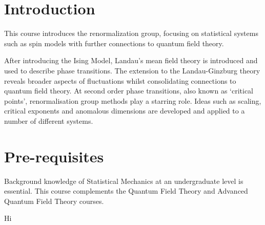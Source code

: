 \documentclass[a4paper,11pt]{article}
\begin{document}
	\maketitlepage
	\preliminaries

	\section*{Introduction}
	
	This course introduces the renormalization group, focusing on statistical systems such as spin models with further connections to quantum field theory.

	\noindent After introducing the Ising Model, Landau’s mean field theory is introduced and used to describe phase transitions. The extension to the Landau-Ginzburg theory reveals broader aspects of fluctuations whilst consolidating connections to quantum field theory. At second order phase transitions, also known as ‘critical points’, renormalisation group methods play a starring role. Ideas such as scaling, critical exponents and anomalous dimensions are developed and applied to a number of different systems.

	\section*{Pre-requisites}

	Background knowledge of Statistical Mechanics at an undergraduate level is essential. This course complements the Quantum Field Theory and Advanced Quantum Field Theory courses.
  
	\newpage
	\tableofcontents
	\newpage
	\maintext
	Hi

	
\end{document}
